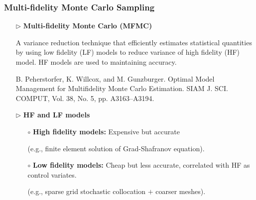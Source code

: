 \documentclass{beamer}
\begin{document}
\begin{frame}[t]
    \frametitle{Multi-fidelity Monte Carlo Sampling}
\begin{itemize}[leftmargin=5pt] 
\item[$\triangleright$] \textcolor{myblue3}{\bf Multi-fidelity Monte Carlo (MFMC)} 

{\footnotesize A variance reduction technique that efficiently estimates statistical quantities by using low fidelity (LF) models to reduce variance of high fidelity (HF) model. HF models are used to maintaining accuracy.}

%
\vspace{2mm}
%
{\fontsize{7}{7}\selectfont \textcolor{mygray2}{B. Peherstorfer, K. Willcox, and M. Gunzburger. Optimal Model Management for Multifidelity Monte Carlo Estimation. SIAM J. SCI. COMPUT, Vol. 38, No. 5, pp. A3163–A3194.}\par}
%

\item[$\triangleright$] \textcolor{myblue3}{\bf HF and LF models} 

{\footnotesize 
\begin{itemize}[leftmargin=5pt] 
     \item[$\circ$] {\bf High fidelity models:} Expensive but accurate 
     
     (e.g., finite element solution of Grad-Shafranov equation).
     \item[$\circ$] {\bf Low fidelity models:} Cheap but less accurate, correlated with HF as control variates.
     
     (e.g., sparse grid stochastic collocation $+$ coarser meshes).


\end{itemize}
 }

\end{itemize}
\end{frame}
\end{document}
